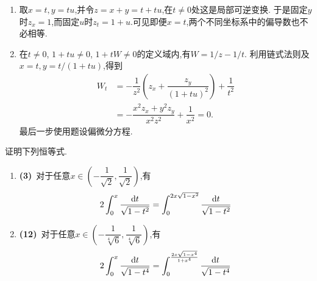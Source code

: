 \documentclass{ctexart}
\begin{document}
\begin{solution}
\begin{enumerate}[label=\tbf{(\arabic*)},leftmargin=*]
\item 取$x=t,y=tu$,并令$z=x+y=t+tu$,在$t\neq0$处这是局部可逆变换.
于是固定$y$时$z_x=1$,而固定$u$时$z_t=1+u$.可见即便$x=t$,两个不同坐标系中的偏导数也不必相等.
\item 在$t\neq0$, $1+tu\neq0$, $1+tW\neq0$的定义域内,有$W=1/z-1/t$.
利用链式法则及$x=t,y=t/(1+tu)$,得到
\[\begin{aligned}
W_t&=-\dfrac1{z^2}\left(z_x+\dfrac{z_y}{(1+tu)^2}\right)+\dfrac1{t^2}\\
&=-\dfrac{x^2z_x+y^2z_y}{x^2z^2}+\dfrac1{x^2}=0.
\end{aligned}\]
最后一步使用题设偏微分方程.
\end{enumerate}
\end{solution}
\begin{problem}[8.(15\songti{分})]
证明下列恒等式.
        \begin{enumerate}[label=\tbf{(\arabic*)}]
            \item \textbf{(3)}\ 对于任意$x\in\left(-\dfrac{1}{\sqrt2},\dfrac{1}{\sqrt2}\right)$,有\[2\int_0^x\dfrac{\mathrm{d} t}{\sqrt{1-t^2}}=\int_0^{2x\sqrt{1-x^2}}\dfrac{\mathrm{d} t}{\sqrt{1-t^2}}\]
            \item \textbf{(12)}\ 对于任意$x\in\left(-\dfrac{1}{\sqrt[4]{6}},\dfrac{1}{\sqrt[4]{6}}\right)$,有\[2\int_0^x\dfrac{\mathrm{d} t}{\sqrt{1-t^4}}=\int_{0}^{\frac{2x\sqrt{1-x^4}}{1+x^4}}\dfrac{\mathrm{d} t}{\sqrt{1-t^4}}\]
        \end{enumerate}
\end{problem}
\end{document}
